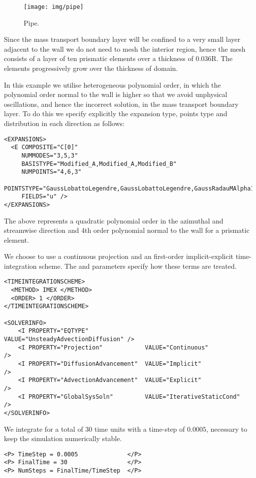 \begin{figure}[h!]
\begin{center}
\texttt{[image: img/pipe]}
\caption{Pipe.}
\end{center}
\end{figure}

Since the mass transport boundary layer will be confined to a very small layer
adjacent to the wall we do not need to mesh the interior region, hence the mesh
consists of a layer of ten prismatic elements over a thickness of 0.036R. The
elements progressively grow over the thickness of domain.

In this example we utilise heterogeneous polynomial order, in which the
polynomial order normal to the wall is higher so that we avoid unphysical
oscillations, and hence the incorrect solution, in the mass transport boundary
layer. To do this we specify explicitly the expansion type, points type and
distribution in each direction as follows:
\begin{lstlisting}[style=XMLStyle]
<EXPANSIONS>
  <E COMPOSITE="C[0]"
     NUMMODES="3,5,3"
     BASISTYPE="Modified_A,Modified_A,Modified_B"
     NUMPOINTS="4,6,3"
     POINTSTYPE="GaussLobattoLegendre,GaussLobattoLegendre,GaussRadauMAlpha1Beta0"
     FIELDS="u" />
</EXPANSIONS>
\end{lstlisting}

The above represents a quadratic polynomial order in the azimuthal and
streamwise direction and 4th order polynomial normal to the wall for a prismatic
element.

We choose to use a continuous projection and an first-order implicit-explicit
time-integration scheme. The  and
 parameters specify how these terms are treated.
\begin{lstlisting}[style=XMLStyle]
<TIMEINTEGRATIONSCHEME>
  <METHOD> IMEX </METHOD>
  <ORDER> 1 </ORDER>
</TIMEINTEGRATIONSCHEME>

<SOLVERINFO>
    <I PROPERTY="EQTYPE"                VALUE="UnsteadyAdvectionDiffusion" />
    <I PROPERTY="Projection"            VALUE="Continuous"                 />
    <I PROPERTY="DiffusionAdvancement"  VALUE="Implicit"                   />
    <I PROPERTY="AdvectionAdvancement"  VALUE="Explicit"                   />
    <I PROPERTY="GlobalSysSoln"         VALUE="IterativeStaticCond"        />
</SOLVERINFO>
\end{lstlisting}

We integrate for a total of $30$ time units with a time-step of $0.0005$,
necessary to keep the simulation numerically stable.
\begin{lstlisting}[style=XMLStyle]
<P> TimeStep = 0.0005              </P>
<P> FinalTime = 30                 </P>
<P> NumSteps = FinalTime/TimeStep  </P>
\end{lstlisting}

